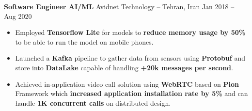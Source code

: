 \textbf{Software Engineer AI/ML} Avidnet Technology -- Tehran, Iran \hfill Jan 2018 -- Aug 2020
\vspace{-10pt}
\begin{itemize}
      \item Employed \textbf{Tensorflow Lite} for models to \textbf{reduce memory usage by 50\%} to be able to run the model on mobile phones.
      \item Launched a \textbf{Kafka} pipeline to gather data from sensors using \textbf{Protobuf}
            and store into \textbf{DataLake} capable of handling \textbf{+20k messages per second}.
      \item Achieved in-application video call solution using \textbf{WebRTC} based on \textbf{Pion}
            Framework which \textbf{increased application installation rate by 5\%} and can
            handle \textbf{1K concurrent calls} on distributed design.
\end{itemize}
